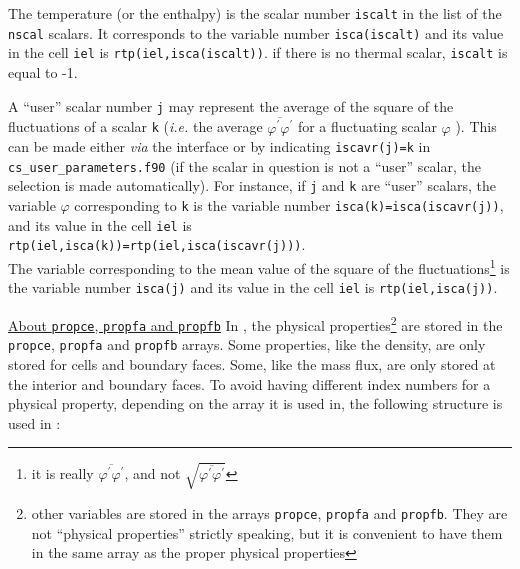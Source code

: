 {{{\begin{list}{-}{}
\item The temperature (or the enthalpy) is the scalar number
      \texttt{iscalt} in the list of the \texttt{nscal}
      scalars. It corresponds to the variable number \texttt{isca(iscalt)}
      and its value in the cell \texttt{iel} is
      \texttt{rtp(iel,isca(iscalt))}. if there is no thermal scalar,
      \texttt{iscalt} is equal to -1.
\item A ``user'' scalar number \texttt{j} may represent the average of the
      square of the fluctuations of a scalar \texttt{k} ({\em i.e.} the average
      $\overline{\varphi^\prime\varphi^\prime}$ for a fluctuating scalar
      $\varphi$ ). This can be made either {\em via} the
      interface or by indicating \texttt{iscavr(j)=k} in
      \texttt{cs\_user\_parameters.f90} (if the scalar in question is not a ``user''
      scalar, the selection is made automatically). For instance, if \texttt{j}
      and \texttt{k} are ``user'' scalars, the variable $\varphi$ corresponding
      to \texttt{k} is the variable number \texttt{isca(k)=isca(iscavr(j))},
      and its value in the cell \texttt{iel} is \\
      \texttt{rtp(iel,isca(k))=rtp(iel,isca(iscavr(j)))}. \\
The variable corresponding to the mean value of the square of the
      fluctuations\footnote{it is really
      $\overline{\varphi^\prime\varphi^\prime}$, and not
      $\displaystyle\sqrt{\overline{\varphi^\prime\varphi^\prime}}$} is
      the variable number \texttt{isca(j)} and its value in the cell \texttt{iel}
      is \texttt{rtp(iel,isca(j))}.
\end{list}

\bigskip

\underline{About \texttt{propce}, \texttt{propfa} and \texttt{propfb}}
In \CS, the physical properties\footnote{other variables are stored in the
arrays \texttt{propce}, \texttt{propfa} and \texttt{propfb}. They are not
``physical properties'' strictly speaking, but it is convenient to have them
in the same array as the proper physical properties} are stored in the
\texttt{propce}, \texttt{propfa} and \texttt{propfb} arrays.
Some properties, like the density, are only stored for cells and boundary
faces. Some, like the mass flux, are only stored at the interior and boundary
faces. To avoid having different index numbers for a physical property,
depending on the array it is used in, the following structure is used in \CS:

\begin{list}{-}{}


\end{list}}}}
